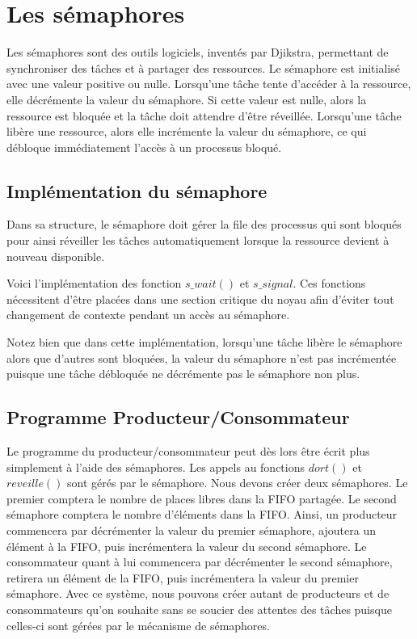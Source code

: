 \section{Les sémaphores}
Les sémaphores sont des outils logiciels, inventés par Djikstra, permettant de synchroniser des tâches et à partager des ressources. Le sémaphore est initialisé avec une valeur positive ou nulle. Lorsqu'une tâche tente d'accéder à la ressource, elle décrémente la valeur du sémaphore. Si cette valeur est nulle, alors la ressource est bloquée et la tâche doit attendre d'être réveillée.
Lorsqu'une tâche libère une ressource, alors elle incrémente la valeur du sémaphore, ce qui débloque immédiatement l'accès à un processus bloqué.

\subsection{Implémentation du sémaphore}
Dans sa structure, le sémaphore doit gérer la file des processus qui sont bloqués pour ainsi réveiller les tâches automatiquement lorsque la ressource devient à nouveau disponible.


Voici l'implémentation des fonction $s\_wait()$ et $s\_signal$. Ces fonctions nécessitent d'être placées dans une section critique du noyau afin d'éviter tout changement de contexte pendant un accès au sémaphore.


Notez bien que dans cette implémentation, lorsqu'une tâche libère le sémaphore alors que d'autres sont bloquées, la valeur du sémaphore n'est pas incrémentée puisque une tâche débloquée ne décrémente pas le sémaphore non plus.

\subsection{Programme Producteur/Consommateur}
Le programme du producteur/consommateur peut dès lors être écrit plus simplement à l'aide des sémaphores. Les appels au fonctions $dort()$ et $reveille()$ sont gérés par le sémaphore.
Nous devons créer deux sémaphores. Le premier comptera le nombre de places libres dans la FIFO partagée. Le second sémaphore comptera le nombre d'éléments dans la FIFO.
Ainsi, un producteur commencera par décrémenter la valeur du premier sémaphore, ajoutera un élément à la FIFO, puis incrémentera la valeur du second sémaphore.
Le consommateur quant à lui commencera par décrémenter le second sémaphore, retirera un élément de la FIFO, puis incrémentera la valeur du premier sémaphore.
Avec ce système, nous pouvons créer autant de producteurs et de consommateurs qu'on souhaite sans se soucier des attentes des tâches puisque celles-ci sont gérées par le mécanisme de sémaphores.